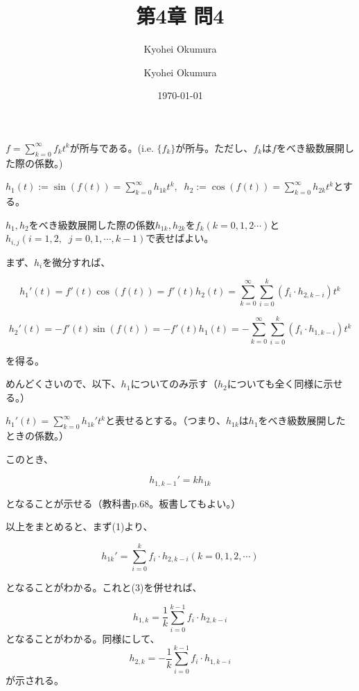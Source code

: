 \documentclass[11pt,a4paper]{article}
\author{Kyohei Okumura}
\begin{document}
\title{第4章 問4}
\author{Kyohei Okumura}
\date{\today}
\maketitle

$f = \displaystyle{\sum_{k=0}^\infty f_k t^k}$が所与である。(i.e. $\{f_k\}$が所与。ただし、$f_k$は$f$をべき級数展開した際の係数。)

$\displaystyle{ h_1(t):= \sin(f(t)) = \sum_{k=0}^\infty h_{1k}t^k, \;\; h_2 := \cos(f(t)) = \sum_{k=0}^\infty h_{2k}t^k}$とする。

$h_1,h_2$をべき級数展開した際の係数$h_{1k}, h_{2k}$を$f_k(k=0,1,2 \cdots)$と$h_{i,j}(i=1,2, \;\; j=0,1,\cdots,k-1)$で表せばよい。

まず、$h_{i}$を微分すれば、

\begin{equation}
h_1'(t) = f'(t) \cos(f(t)) = f'(t)h_2(t) = \sum_{k=0}^\infty \sum_{i=0}^k (f_i \cdot h_{2,k-i})t^k
\end{equation}

\begin{equation}
h_2'(t) = -f'(t) \sin(f(t)) = -f'(t)h_1(t) = -\sum_{k=0}^\infty \sum_{i=0}^k (f_i \cdot h_{1,k-i})t^k
\end{equation}

を得る。

めんどくさいので、以下、$h_1$についてのみ示す（$h_2$についても全く同様に示せる。）

$\displaystyle{h_1'(t) = \sum_{k=0}^\infty h_{1k}'t^k}$と表せるとする。（つまり、$h_{1k}$は$h_1$をべき級数展開したときの係数。）

このとき、

\begin{equation}
h_{1,k-1}' = kh_{1k}
\end{equation}

となることが示せる（教科書p.68。板書してもよい。）

以上をまとめると、まず(1)より、

\begin{equation}
h_{1k}' = \sum_{i=0}^k f_i \cdot h_{2,k-i} (k=0,1,2,\cdots)
\end{equation}

となることがわかる。これと(3)を併せれば、

\begin{equation}
h_{1,k} = \frac{1}{k} \sum_{i=0}^{k-1} f_i \cdot h_{2,k-i} 
\end{equation}
となることがわかる。同様にして、
\begin{equation}
h_{2,k} = - \frac{1}{k} \sum_{i=0}^{k-1} f_i \cdot h_{1,k-i} 
\end{equation}
が示される。
\end{document}

